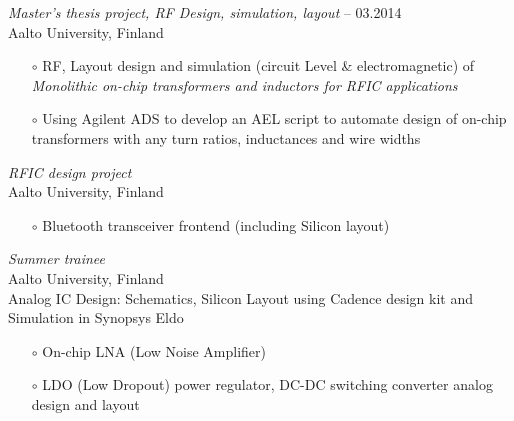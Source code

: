 \documentclass[margin , 10pt]{res} %
\renewcommand{\headrulewidth}{0.3pt}
\begin{document}
\begin{resume}
\begin{itemize}
		\end{itemize}
		{\sl Master's thesis project, RF Design, simulation, layout }  -- 03.2014\\
		Aalto University, Finland\\
		\begin{itemize}
			\item[$\circ$] RF, Layout design and simulation (circuit Level \& electromagnetic) of  \textit{Monolithic on-chip transformers and inductors for RFIC applications} 
			\item[$\circ$] Using Agilent ADS to develop an AEL script to automate design of on-chip transformers with any turn ratios, inductances and wire widths
		\end{itemize}
		
		{\sl RFIC design project } \\
		Aalto University, Finland\\
		\begin{itemize}
			\item[$\circ$] Bluetooth transceiver frontend (including Silicon layout)
		\end{itemize} 
		
		{\sl Summer trainee} \\
		Aalto University, Finland\\
		Analog IC Design: Schematics, Silicon Layout using Cadence design kit and Simulation in Synopsys Eldo
		\begin{itemize}
			\item[$\circ$] On-chip LNA (Low Noise Amplifier) 
			\item[$\circ$] LDO (Low Dropout) power regulator, DC-DC switching converter analog design and layout
		\end{itemize}
		

\end{resume}
\end{document}
